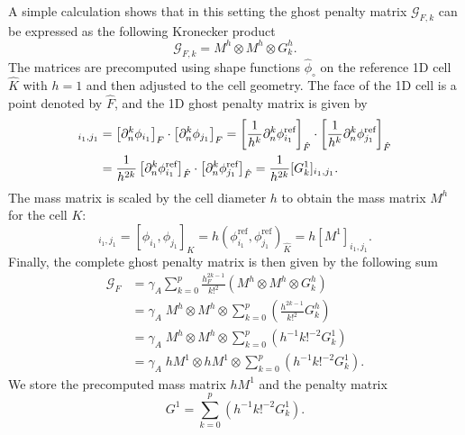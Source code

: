 \documentclass[11pt,a4paper]{article}
\begin{document}
A simple calculation shows that in this setting the ghost penalty matrix $\mathcal{G}_{F,k}$ can be expressed as the
following Kronecker product
\begin{equation}
    \mathcal{G}_{F,k} = M^{h} \otimes M^{h} \otimes G^h_k .
\end{equation}
The matrices are precomputed using shape functions $\hat{\phi}_\circ $ on the reference  1D cell $\hat{K}$ with $h=1$
and then adjusted to the cell geometry. The face of the 1D cell is a point denoted by $\hat{F}$, and the 1D ghost
penalty matrix
is given by
\begin{align}
    [G^h_k]_{i_1,j_1} & = \left[\partial_n^k \phi_{i_1}\right]_{F}\cdot \left[\partial_n^k \phi_{j_1}\right]_{F}
    =  \left[{1\over h^k} \partial_n^k \phi^{\text{ref}}_{i_1}\right] _{\hat{F}} \cdot \left[{1\over h^k}
        \partial_n^k \phi^\text{ref}_{j_1}\right]_{\hat{F}}						     \nonumber
    \\
                      & = {1\over h^{2k}} \left[\partial_n^k \phi^{\text{ref}}_{i_1}\right]_{\hat{F}}\cdot
    \left[\partial_n^k \phi^{\text{ref}}_{j_1}\right]_{\hat{F}}= {1\over h^{2k}} [G^1_k]_{i_1,j_1}.
\end{align}
The mass matrix is scaled by the cell diameter $h$ to obtain the mass matrix $M^h$ for the cell $K$:
\begin{equation}
    [M^h]_{i_1,j_1} = \left[\phi_{i_1}, \phi_{j_1}\right]_K =h \left(\phi^{\text{ref}}_{i_1},
    \phi^{\text{ref}}_{j_1}\right)_{\hat{K}} = h[M^1]_{i_1,j_1}.
\end{equation}
Finally, the complete ghost penalty matrix is then given by the following sum
\begin{align}
    \mathcal{G}_F & = \gamma_A \sum_{k=0}^p \frac{h_F^{2k-1}}{k!^2} \left( M^h \otimes M^h \otimes G^h_k
    \right)  \nonumber
    \\
                  & = \gamma_A \;	M^h \otimes M^h \otimes \sum_{k=0}^p \left(
    \frac{h^{2k-1}}{k!^2}
    G^h_k \right) \nonumber
    \\
                  & = \gamma_A \; M^h \otimes M^h \otimes	\sum_{k=0}^p \left( {  h^{-1} k!^{-2}}
    G^1_k
    \right)  \nonumber
    \\
                  & = \gamma_A \; h M^1 \otimes h M^1 \otimes	\sum_{k=0}^p \left( { h^{-1} k!^{-2}}
    G^1_k
    \right).
    \label{eq:ghostPenaltyMatrixRev}
\end{align}
We store the precomputed mass matrix $h M^1$ and the penalty matrix
\begin{equation}
    G^1 = \sum_{k=0}^p \left( { h^{-1} k!^{-2}} G^1_k \right).
\end{equation}
\end{document}
